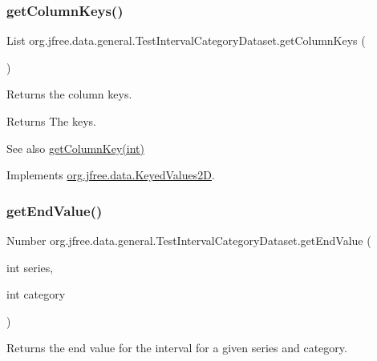 \subsubsection{\texorpdfstring{get\+Column\+Keys()}{getColumnKeys()}}
{\footnotesize\ttfamily List org.\+jfree.\+data.\+general.\+Test\+Interval\+Category\+Dataset.\+get\+Column\+Keys (\begin{DoxyParamCaption}{ }\end{DoxyParamCaption})}

Returns the column keys.

\begin{DoxyReturn}{Returns}
The keys.
\end{DoxyReturn}
\begin{DoxySeeAlso}{See also}
\mbox{\hyperlink{classorg_1_1jfree_1_1data_1_1general_1_1_test_interval_category_dataset_a55b29571a2a0e450010e23a8ce7ad872}{get\+Column\+Key(int)}} 
\end{DoxySeeAlso}


Implements \mbox{\hyperlink{interfaceorg_1_1jfree_1_1data_1_1_keyed_values2_d_af6b8780fee7cccdb967fc0f199398615}{org.\+jfree.\+data.\+Keyed\+Values2D}}.

\mbox{\label{classorg_1_1jfree_1_1data_1_1general_1_1_test_interval_category_dataset_afa3067d374cf2eb3258450ead75d2cb8}} 
\subsubsection{\texorpdfstring{get\+End\+Value()}{getEndValue()}\hspace{0.1cm}{\footnotesize\ttfamily [1/2]}}
{\footnotesize\ttfamily Number org.\+jfree.\+data.\+general.\+Test\+Interval\+Category\+Dataset.\+get\+End\+Value (\begin{DoxyParamCaption}\item[{int}]{series,  }\item[{int}]{category }\end{DoxyParamCaption})}

Returns the end value for the interval for a given series and category.


